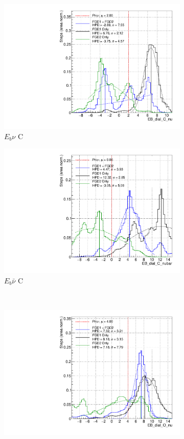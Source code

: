 \begin{figure}
\centering
\begin{subfigure}{.48\textwidth}
  \centering
  \includegraphics[width=0.73\linewidth]{figs/FGD_EB_dial_C_nu}
  \caption{$E_{b}\nu$ C}
\end{subfigure}
\begin{subfigure}{.48\textwidth}
  \centering
  \includegraphics[width=0.73\linewidth]{figs/FGD_EB_dial_C_nubar}
  \caption{$E_{b}\bar{\nu}$ C}
\end{subfigure} \\
\begin{subfigure}{.48\textwidth}
  \centering
  \includegraphics[width=0.73\linewidth]{figs/FGD_EB_dial_O_nu}

\end{subfigure}
\end{figure}
